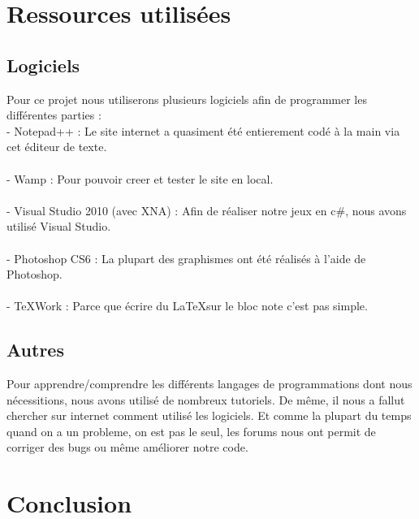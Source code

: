 \documentclass [11pt]{report}
\begin{document}
\chapter {Ressources utilisées}
	\section {Logiciels}

	Pour ce projet nous utiliserons plusieurs logiciels afin de programmer les différentes parties :\\

	- Notepad++ : Le site internet a quasiment été entierement codé à la main via cet éditeur de texte.\\\\\indent
	- Wamp : Pour pouvoir creer et tester le site en local.\\\\\indent
	- Visual Studio 2010 (avec XNA) : Afin de réaliser notre jeux en c\#, nous avons utilisé Visual Studio.\\\\\indent
	- Photoshop CS6 : La plupart des graphismes ont été réalisés à l'aide de Photoshop.\\\\\indent
	- TeXWork : Parce que écrire du \LaTeX sur le bloc note c'est pas simple.\\\vspace{10mm}



	\section {Autres}

	Pour apprendre/comprendre les différents langages de programmations dont nous nécessitions, nous avons utilisé de nombreux tutoriels. De même, il nous a fallut chercher sur internet comment utilisé les logiciels. Et comme la plupart du temps quand on a un probleme, on est pas le seul, les forums nous ont permit de corriger des bugs ou même améliorer notre code.




\chapter {Conclusion}
\end{document}
